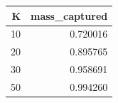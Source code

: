 \begin{tabular}{rr}
\toprule
K & mass_captured \\
\midrule
10 & 0.720016 \\
20 & 0.895765 \\
30 & 0.958691 \\
50 & 0.994260 \\
\bottomrule
\end{tabular}
